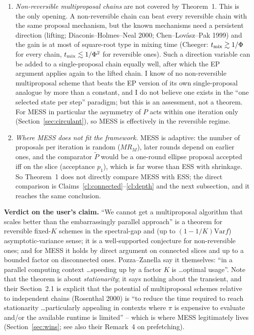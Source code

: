 \documentclass[11pt,a4paper]{article}
\theoremstyle{remark}
\begin{document}
\begin{enumerate}[leftmargin=*]
\item \emph{Non-reversible multiproposal chains} are not covered by Theorem~1. This is the only opening. A non-reversible chain can beat every reversible chain with the same proposal mechanism, but the known mechanisms need a persistent direction (lifting; Diaconis--Holmes--Neal 2000; Chen--Lov\'asz--Pak 1999) and the gain is at most of square-root type in mixing time (Cheeger: $t_{\rm mix}\gtrsim1/\Phi$ for every chain, $t_{\rm mix}\lesssim1/\Phi^2$ for reversible ones). Such a direction variable can be added to a single-proposal chain equally well, after which the EP argument applies again to the lifted chain. I know of no non-reversible multiproposal scheme that beats the EP version of its own single-proposal analogue by more than a constant, and I do not believe one exists in the ``one selected state per step'' paradigm; but this is an assessment, not a theorem. For MESS in particular the asymmetry of $P$ acts within one iteration only (Section~\ref{sec:circulant}), so MESS is effectively in the reversible regime.
\item \emph{Where MESS does not fit the framework.} MESS is adaptive: the number of proposals per iteration is random ($MR_M$), later rounds depend on earlier ones, and the comparator $\tilde P$ would be a one-round ellipse proposal accepted iff on the slice (acceptance $p_1$), which is far worse than ESS with shrinkage. So Theorem~1 does not directly compare MESS with ESS; the direct comparison is Claims~\ref{cl:connected}--\ref{cl:depth} and the next subsection, and it reaches the same conclusion.
\end{enumerate}
\textbf{Verdict on the user's claim.} ``We cannot get a multiproposal algorithm that scales better than the embarrassingly parallel approach'' is a theorem for reversible fixed-$K$ schemes in the spectral-gap and (up to $(1-1/K)\mathrm{Var}f$) asymptotic-variance sense; it is a well-supported conjecture for non-reversible ones; and for MESS it holds by direct argument on connected slices and up to a bounded factor on disconnected ones. Pozza--Zanella say it themselves: ``in a parallel computing context \dots speeding up by a factor $K$ is \dots optimal usage''. Note that the theorem is about \emph{stationarity}; it says nothing about the transient, and their Section~2.1 is explicit that the potential of multiproposal schemes relative to independent chains (Rosenthal 2000) is ``to reduce the time required to reach stationarity \dots particularly appealing in contexts where $\pi$ is expensive to evaluate and/or the available runtime is limited'' -- which is where MESS legitimately lives (Section~\ref{sec:wins}; see also their Remark~4 on prefetching).
\end{document}
